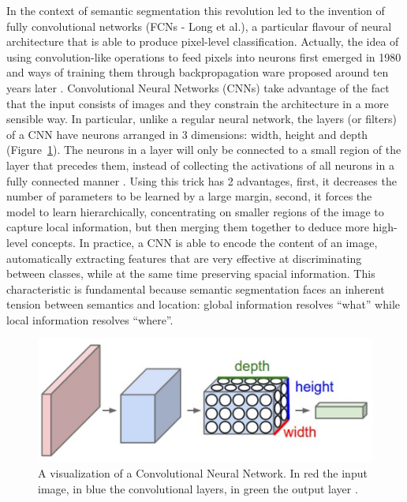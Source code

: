 In the context of semantic segmentation this revolution led to the invention of fully convolutional networks (FCNs - Long et al.\cite{long2015fully}), a particular flavour of neural architecture that is able to produce pixel-level classification. Actually, the idea of using convolution-like operations to feed pixels into neurons first emerged in 1980 \cite{fukushima1980neocognitron} and ways of training them through backpropagation ware proposed around ten years later \cite{waibel1995phoneme}\cite{lecun1989backpropagation}.
Convolutional Neural Networks (CNNs) take advantage of the fact that the input consists of images and they constrain the architecture in a more sensible way. In particular, unlike a regular neural network, the layers (or filters) of a CNN have neurons arranged in 3 dimensions: width, height and depth (Figure~\ref{fig:conv-layer}). The neurons in a layer will only be connected to a small region of the layer that precedes them, instead of collecting the activations of all neurons in a fully connected manner \cite{cnn-stanford}. Using this trick has 2 advantages, first, it decreases the number of parameters to be learned by a large margin, second, it forces the model to learn hierarchically, concentrating on smaller regions of the image to capture local information, but then merging them together to deduce more high-level concepts. In practice, a CNN is able to encode the content of an image, automatically extracting features that are very effective at discriminating between classes, while at the same time preserving spacial information. This characteristic is fundamental because semantic segmentation faces an inherent tension between semantics and location: global information resolves ``what'' while local information resolves ``where''\cite{long2015fully}.
\begin{figure}[t]
    \centering
    \includegraphics[width=\textwidth]{./pictures/conv-layer}
    \caption{A visualization of a Convolutional Neural Network. In red the input image, in blue the convolutional layers, in green the output layer \cite{cnn-stanford}.}
    \label{fig:conv-layer}
\end{figure}
